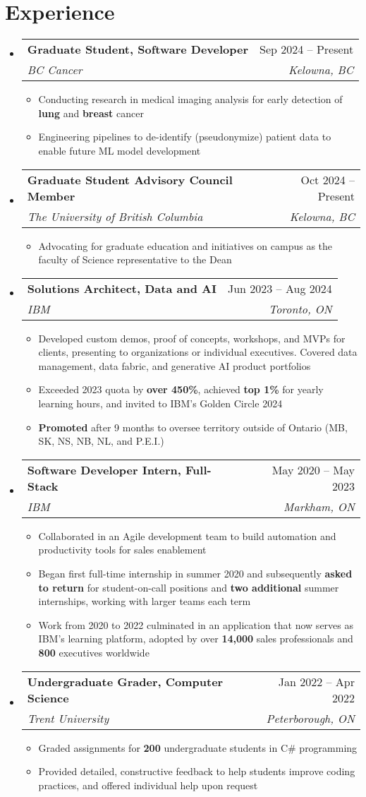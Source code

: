 \documentclass[letterpaper,10pt]{article}
\makeatletter
\newcommand{\resumeItem}[1]{
  \item\small{
    {#1 \vspace{-2pt}}
  }
}
\newcommand{\resumeSubheading}[4]{
  \vspace{-0.9pt}\item
    \begin{tabular*}{0.97\textwidth}[t]{l@{\extracolsep{\fill}}r}
      \textbf{\small#1} & \small#2 \\
      \textit{\small#3} & \textit{\small #4} \\
    \end{tabular*}\vspace{-7pt}
}
\newcommand{\resumeSubHeadingListStart}{\begin{itemize}[leftmargin=0.15in, label={}]}
\newcommand{\resumeSubHeadingListEnd}{\end{itemize}}
\newcommand{\resumeItemListStart}{\begin{itemize}}
\newcommand{\resumeItemListEnd}{\end{itemize}\vspace{-5pt}}
\makeatother
\begin{document}
\section{Experience}
  \resumeSubHeadingListStart
    \resumeSubheading
      {Graduate Student, Software Developer}{Sep 2024 -- Present}
      {BC Cancer}{Kelowna, BC}
      \resumeItemListStart
        \resumeItem{Conducting research in medical imaging analysis for early detection of \textbf{lung} and \textbf{breast} cancer}
        \resumeItem{Engineering pipelines to de-identify (pseudonymize) patient data to enable future ML model development}
      \resumeItemListEnd
    \resumeSubheading
      {Graduate Student Advisory Council Member}{Oct 2024 -- Present}
      {The University of British Columbia}{Kelowna, BC}
      \resumeItemListStart
        \resumeItem{Advocating for graduate education and initiatives on campus as the faculty of Science representative to the Dean}
      \resumeItemListEnd
    \resumeSubheading
      {Solutions Architect, Data and AI}{Jun 2023 -- Aug 2024}
      {IBM}{Toronto, ON}
      \resumeItemListStart
        \resumeItem{Developed custom demos, proof of concepts, workshops, and MVPs for clients, presenting to organizations or individual executives. Covered data management, data fabric, and generative AI product portfolios}
        \resumeItem{Exceeded 2023 quota by \textbf{over 450\%}, achieved \textbf{top 1\%} for yearly learning hours, and invited to IBM's Golden Circle 2024}
        \resumeItem{\textbf{Promoted} after 9 months to oversee territory outside of Ontario (MB, SK, NS, NB, NL, and P.E.I.)}
      \resumeItemListEnd
    \resumeSubheading
      {Software Developer Intern, Full-Stack}{May 2020 -- May 2023}
      {IBM}{Markham, ON}
      \resumeItemListStart
        \resumeItem{Collaborated in an Agile development team to build automation and productivity tools for sales enablement}
        \resumeItem{Began first full-time internship in summer 2020 and subsequently \textbf{asked to return} for student-on-call positions and \textbf{two additional} summer internships, working with larger teams each term}
        \resumeItem{Work from 2020 to 2022 culminated in an application that now serves as IBM's learning platform, adopted by over \textbf{14,000} sales professionals and \textbf{800} executives worldwide}
      \resumeItemListEnd
      \resumeSubheading
      {Undergraduate Grader, Computer Science}{Jan 2022 -- Apr 2022}
      {Trent University}{Peterborough, ON}
      \resumeItemListStart
        \resumeItem{Graded assignments for \textbf{200} undergraduate students in C\# programming}
        \resumeItem{Provided detailed, constructive feedback to help students improve coding practices, and offered individual help upon request}
      \resumeItemListEnd
  \resumeSubHeadingListEnd
\end{document}
